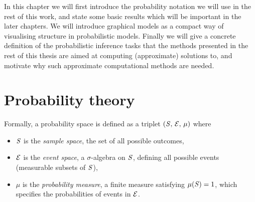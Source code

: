 In this chapter we will first introduce the probability notation we will use in the rest of this work, and state some basic results which will be important in the later chapters. We will introduce graphical models as a compact way of visualising structure in probabilistic models. Finally we will give a concrete definition of the probabilistic inference tasks that the methods presented in the rest of this thesis are aimed at computing (approximate) solutions to, and motivate why such approximate computational methods are needed.


\section{Probability theory}\label{sec:probability-theory}

Formally, a probability space is defined as a triplet $(\mathit{S},\,\mathcal{E},\,\mu)$ where

\begin{itemize}
  \item $\mathit{S}$ is the \emph{sample space}, the set of all possible outcomes,
  \item $\mathcal{E}$ is the \emph{event space}, a $\sigma$-algebra on $\mathit{S}$, defining all possible events (measurable subsets of $\mathit{S}$),
  \item $\mu$ is the \emph{probability measure}, a finite measure satisfying $\mu(\mathit{S}) = 1$, which specifies the probabilities of events in $\mathcal{E}$.
\end{itemize}

